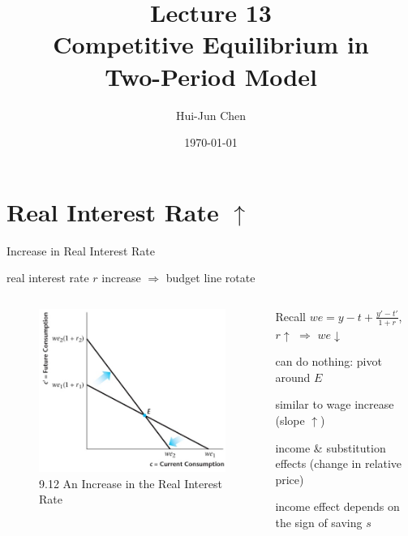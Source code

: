 \documentclass[11pt,aspectratio=169,usenames,dvipsnames]{beamer}
\title[Lecture 13]{Lecture 13 \\ Competitive Equilibrium in \\ Two-Period Model}
\author[Hui-Jun Chen]{Hui-Jun Chen}
\institute[NTHU]{National Tsing Hua University}
\date{\today}
\let\tempone\itemize
\let\temptwo\enditemize
\renewenvironment{itemize}{\tempone\addtolength{\itemsep}{\fill}}{\temptwo}
\begin{document}
\begin{frame}[plain]
    \titlepage
\end{frame}


\section{Real Interest Rate $ \uparrow  $}
\label{sec:Real_Interest_Rate}

\begin{frame}{Increase in Real Interest Rate}
\label{slide:Increase_in_Real_Interest_Rate}
\begin{center}
real interest rate $ r $ increase  $ \Rightarrow  $ budget line \alert{rotate}
\end{center}
\begin{columns}
    \begin{column}{0.5\textwidth}
        \begin{figure}
            \caption{\scriptsize 9.12  An Increase in the Real Interest Rate}
            \includegraphics[width=.8\textwidth]{./figures/Figure9_12.jpg}
        \end{figure}
    \end{column}
    \begin{column}{0.5\textwidth}
        \begin{itemize}
            \item Recall $ \displaystyle  we = y - t + \frac{y' - t'}{1+r} $, $ r \uparrow  $ $ \Rightarrow  $ $ we \downarrow  $
            \item can do nothing: pivot around $ E $
            \item similar to \alert{wage increase} (slope $ \uparrow  $)
            \item income \& substitution effects (change in relative price)
            \item income effect depends on the sign of saving $ s $
        \end{itemize}
    \end{column}
\end{columns}
\end{frame}
\end{document}
